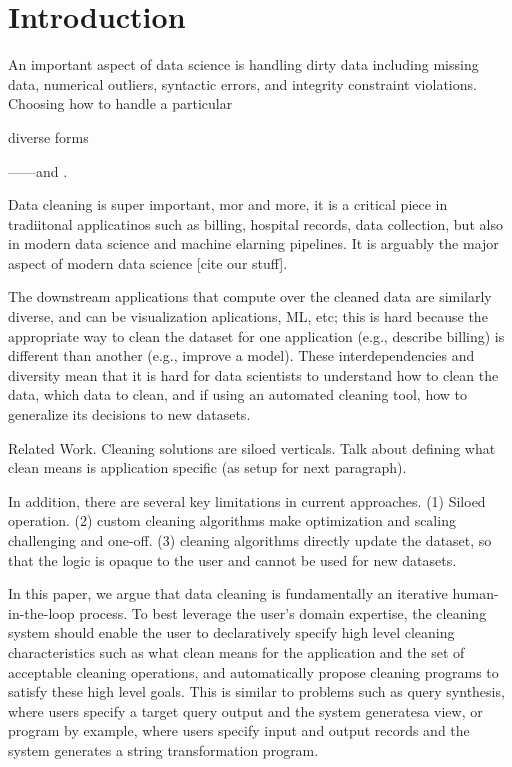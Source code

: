 \section{Introduction}\label{intro}\sloppy
An important aspect of data science is handling dirty data including missing data, numerical outliers, syntactic errors, and integrity constraint violations.
Choosing how to handle a particular 




diverse forms


------and .





Data cleaning is super important, mor and more, it is a critical piece in tradiitonal applicatinos such as billing, hospital records, data collection, but also in modern data science and machine elarning pipelines.  It is arguably the major aspect of modern data science [cite our stuff].

The downstream applications that compute over the cleaned data are similarly diverse, and can be visualization aplications, ML, etc; this is hard because the appropriate way to clean the dataset for one application (e.g., describe billing) is different than another (e.g., improve a model).
These interdependencies and diversity mean that it is hard for data scientists to understand how to clean the data, which data to clean, and if using an automated cleaning tool, how to generalize its decisions to new datasets.

Related Work.  Cleaning solutions are siloed verticals.   Talk about defining what clean means is application specific (as setup for next paragraph).

In addition, there are several key limitations in current approaches.  (1) Siloed operation.   (2) custom cleaning algorithms make optimization and scaling challenging and one-off.  (3) cleaning algorithms directly update the dataset, so that the logic is opaque to the user and cannot be used for new datasets.  

In this paper, we argue that data cleaning is fundamentally an iterative human-in-the-loop process.
To best leverage the user's domain expertise, the cleaning system should enable the user to declaratively specify high level cleaning characteristics
such as what clean means for the application and the set of acceptable cleaning operations, and automatically propose cleaning programs to satisfy these high level goals.
This is similar to problems such as query synthesis, where users specify a target query output and the system generatesa  view, or program by example, where users specify input and output records and the system generates a string transformation program.

